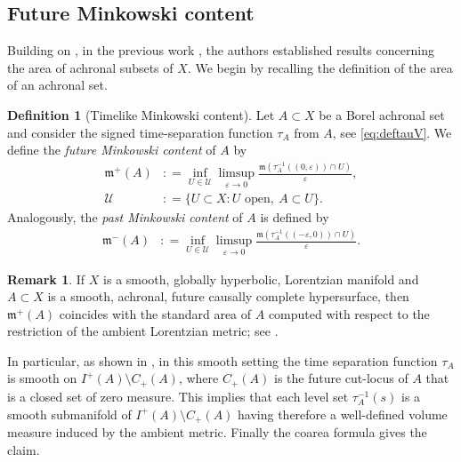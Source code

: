 \documentclass[a4paper,10pt]{article}
\newcommand{\ve}{\varepsilon}
\newcommand{\mm}{\mathfrak m}
\theoremstyle{plain}
\theoremstyle{definition}
\newtheorem{definition}[lemma]{Definition}
\newtheorem{remark}[lemma]{Remark}
\numberwithin{equation}{section}
\begin{document}
\subsection{Future Minkowski content}

Building on , in the previous work  \cite{cavalletti2024sharpisoperimetrictypeinequalitylorentzian}, the authors established results concerning the area of achronal subsets of $X$. 
We begin by recalling the definition of the area of an achronal set.

\begin{definition}[Timelike Minkowski content]\label{D:areaachronal}
Let  $A \subset X$ be a Borel achronal set and consider  
the signed time-separation function $\tau_{A}$ from $A$, see \eqref{eq:deftauV}.
We define the \emph{future Minkowski content} of $A$ by 
%
\begin{equation}\label{E:future}
\begin{split}
    \mm^{+}(A) &: = \inf_{U \in \mathcal{U}} \limsup_{\ve \to 0} \frac{\mm( \tau_{A}^{-1}((0,\ve)) \cap U) }{\ve}, \\ 
\mathcal{U}&: = \{ U \subset X \colon  U \text{ open}, \ A\subset U \}.
\end{split} 
\end{equation}
Analogously, the \emph{past  Minkowski content} of $A$  is defined by 
%
\begin{equation}\label{E:pastMink}
\begin{split}
    \mm^{-}(A) &: = \inf_{U \in \mathcal{U}} \limsup_{\ve \to 0} \frac{\mm( \tau_{A}^{-1}((-\ve,0)) \cap U) }{\ve}.
\end{split} 
\end{equation}
\end{definition}



\begin{remark}\label{rem:mm+=vol}
If $X$ is a smooth, globally hyperbolic, Lorentzian manifold and $A\subset X$ is a smooth, achronal, future causally complete hypersurface, then $\mm^+(A)$ coincides with the standard area of $A$ computed with respect to the restriction of the ambient Lorentzian metric; see \cite[Remark 4.2]{cavalletti2024sharpisoperimetrictypeinequalitylorentzian}. 

In particular, as shown in \cite{TreudeGrant}, in this smooth setting the time separation function $\tau_A$ is smooth on $I^+(A)\setminus C_+(A)$, where $C_+(A)$ is the future cut-locus of $A$ that is a closed set of zero measure. 
This implies that each level set 
$\tau_A^{-1}(s)$ is a smooth submanifold of 
$I^+(A)\setminus C_+(A)$ having therefore a well-defined volume measure induced by the ambient metric. Finally the coarea formula 
\cite[Proposition 3]{TreudeGrant} gives the claim.
\end{remark}
\end{document}
